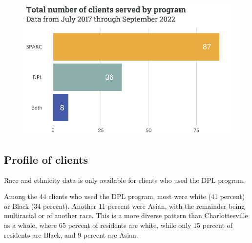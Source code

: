 \documentclass[
  letterpaper,
  DIV=11,
  numbers=noendperiod]{scrartcl}
\begin{document}
\begin{figure}[H]

{\centering \includegraphics{piedmont_files/figure-pdf/totals-1.pdf}

}

\end{figure}

\hypertarget{profile-of-clients}{%
\subsection{Profile of clients}\label{profile-of-clients}}

\begin{tcolorbox}[enhanced jigsaw, coltitle=black, titlerule=0mm, breakable, colbacktitle=quarto-callout-warning-color!10!white, opacityback=0, leftrule=.75mm, opacitybacktitle=0.6, rightrule=.15mm, title=\textcolor{quarto-callout-warning-color}{\faExclamationTriangle}\hspace{0.5em}{Note}, arc=.35mm, colback=white, bottomtitle=1mm, toptitle=1mm, colframe=quarto-callout-warning-color-frame, bottomrule=.15mm, toprule=.15mm, left=2mm]

Race and ethnicity data is only available for clients who used the DPL
program.

\end{tcolorbox}

Among the 44 clients who used the DPL program, most were white (41
percent) or Black (34 percent). Another 11 percent were Asian, with the
remainder being multiracial or of another race. This is a more diverse
pattern than Charlottesville as a whole, where 65 percent of residents
are white, while only 15 percent of residents are Black, and 9 percent
are Asian.
\end{document}
